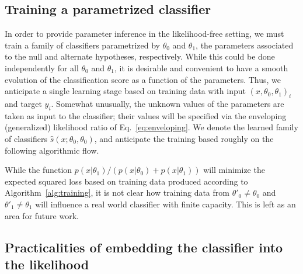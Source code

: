 \documentclass[12pt]{article}
\numberwithin{equation}{section}
\theoremstyle{plain}
\begin{document}
\subsection{Training a parametrized classifier}

In order to provide parameter inference in the likelihood-free setting, we must
train a family of  classifiers parametrized by $\theta_0$ and $\theta_1$, the
parameters associated to the null and alternate hypotheses, respectively. While
this could be done independently for all $\theta_0$ and $\theta_1$, it is
desirable and convenient to have a smooth evolution of the classification score
as a function of the parameters. Thus, we anticipate a single learning stage
based on training data with input $(x, \theta_0, \theta_1)_i$ and target $y_i$.
Somewhat unusually, the unknown values of the parameters are taken as input to
the classifier; their values will be specified via the enveloping (generalized)
likelihood ratio of Eq.~\ref{eq:enveloping}. We denote the learned family of
classifiers $\hat{s}(x; \theta_0, \theta_0)$, and anticipate the training based
roughly on the following algorithmic flow.

While the function $p(x|\theta_1)/(p(x|\theta_0)+p(x|\theta_1))$ will minimize
the expected squared loss based on training data produced according to
Algorithm~\ref{alg:training}, it is not clear how training data from $\theta'_0
\ne \theta_0$ and $\theta'_1 \ne \theta_1$ will influence a real world
classifier with finite capacity. This is left as an area for future work.

\subsection{Practicalities of embedding the classifier into the likelihood}
\end{document}

